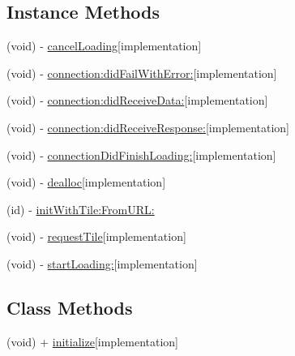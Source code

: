 \subsection*{Instance Methods}
\begin{DoxyCompactItemize}
\item 
(void) -\/ \hyperlink{interface_r_m_web_tile_image_aea32e968718d02f837dc14531c974109}{cancel\-Loading}{\ttfamily  \mbox{[}implementation\mbox{]}}
\item 
(void) -\/ \hyperlink{interface_r_m_web_tile_image_a22ea23034b1100a061de71e3ddc8f938}{connection\-:did\-Fail\-With\-Error\-:}{\ttfamily  \mbox{[}implementation\mbox{]}}
\item 
(void) -\/ \hyperlink{interface_r_m_web_tile_image_a9004ae4a3784bd2e60cb14f0a9c616f0}{connection\-:did\-Receive\-Data\-:}{\ttfamily  \mbox{[}implementation\mbox{]}}
\item 
(void) -\/ \hyperlink{interface_r_m_web_tile_image_a3655e0f544330485431e9058851c4716}{connection\-:did\-Receive\-Response\-:}{\ttfamily  \mbox{[}implementation\mbox{]}}
\item 
(void) -\/ \hyperlink{interface_r_m_web_tile_image_a2e7526f07fba82cd5227599e8cd9bd2a}{connection\-Did\-Finish\-Loading\-:}{\ttfamily  \mbox{[}implementation\mbox{]}}
\item 
(void) -\/ \hyperlink{interface_r_m_web_tile_image_a39b45634801dc11f3662715ccb31d203}{dealloc}{\ttfamily  \mbox{[}implementation\mbox{]}}
\item 
(id) -\/ \hyperlink{interface_r_m_web_tile_image_a4142138d17d638becde01fc69bf76ff3}{init\-With\-Tile\-:\-From\-U\-R\-L\-:}
\item 
(void) -\/ \hyperlink{interface_r_m_web_tile_image_a402f963266245ad08e6137ea8bf23c56}{request\-Tile}{\ttfamily  \mbox{[}implementation\mbox{]}}
\item 
(void) -\/ \hyperlink{interface_r_m_web_tile_image_a8ccdd67094a342f55c82b0cec3319e8b}{start\-Loading\-:}{\ttfamily  \mbox{[}implementation\mbox{]}}
\end{DoxyCompactItemize}
\subsection*{Class Methods}
\begin{DoxyCompactItemize}
\item 
(void) + \hyperlink{interface_r_m_web_tile_image_a78883d4f8c2ab676fc01cfaaa81c0fb7}{initialize}{\ttfamily  \mbox{[}implementation\mbox{]}}
\end{DoxyCompactItemize}
